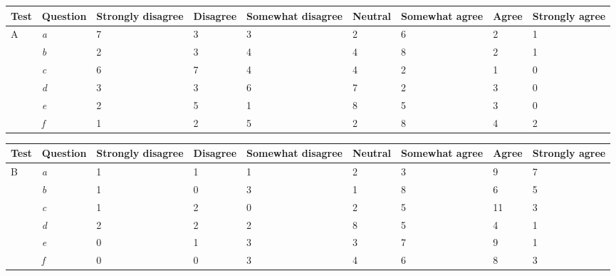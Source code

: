 \begin{center}\small \label{TestA}
	\begin{tabular}{ p{1.4cm} | p{1.4cm} | p{1.3cm} | p{1.4cm} | p{1.7cm} | p{1.2cm} | p{1.7cm} | p{0.9cm}| p{1.3cm} |}
\hline
	\textbf{Test}	&	\textbf{Question}	&	\textbf{Strongly disagree}	&	\textbf{Disagree}	&	\textbf{Somewhat disagree}	&	\textbf{Neutral}	&	\textbf{Somewhat agree}	&	\textbf{Agree}	&	\textbf{Strongly agree} \\ \hline
A	&	\textit{a}	&	7	&	3	&	3	&	2	&	6	&	2	&	1	\\ \hline
	&	\textit{b}	&	2	&	3	&	4	&	4	&	8	&	2	&	1	\\ \hline
	&	\textit{c}	&	6	&	7	&	4	&	4	&	2	&	1	&	0	\\ \hline
	&	\textit{d}	&	3	&	3	&	6	&	7	&	2	&	3	&	0	\\ \hline
	&	\textit{e}	&	2	&	5	&	1	&	8	&	5	&	3	&	0	\\ \hline
	&	\textit{f}	&	1	&	2	&	5	&	2	&	8	&	4	&	2	\\ \hline
	\end{tabular}
\end{center}	
\begin{center}\small \label{TestB}
	\begin{tabular}{ p{1.4cm} | p{1.4cm} | p{1.3cm} | p{1.4cm} | p{1.7cm} | p{1.2cm} | p{1.7cm} | p{0.9cm}| p{1.3cm} |}
\hline	
	\textbf{Test}	&	\textbf{Question}	&	\textbf{Strongly disagree}	&	\textbf{Disagree}	&	\textbf{Somewhat disagree}	&	\textbf{Neutral}	&	\textbf{Somewhat agree}	&	\textbf{Agree}	&	\textbf{Strongly agree}	\\ \hline
B	&	\textit{a}	&	1	&	1	&	1	&	2	&	3	&	9	&	7	\\ \hline
	&	\textit{b}	&	1	&	0	&	3	&	1	&	8	&	6	&	5	\\ \hline
	&	\textit{c}	&	1	&	2	&	0	&	2	&	5	&	11	&	3	\\ \hline
	&	\textit{d}	&	2	&	2	&	2	&	8	&	5	&	4	&	1	\\ \hline
	&	\textit{e}	&	0	&	1	&	3	&	3	&	7	&	9	&	1	\\ \hline
	&	\textit{f}	&	0	&	0	&	3	&	4	&	6	&	8	&	3	\\ \hline
	\end{tabular}
\end{center}	
